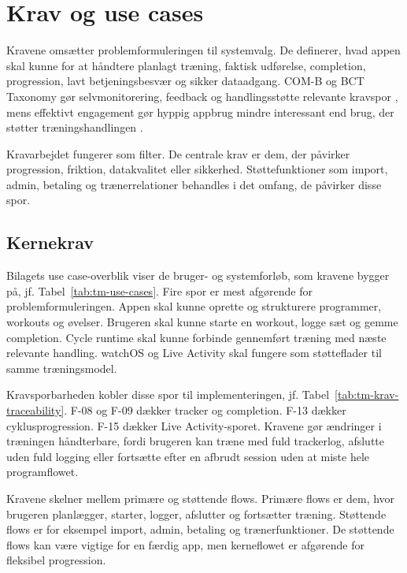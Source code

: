 \section{Krav og use cases}

Kravene omsætter problemformuleringen til systemvalg. De definerer, hvad appen skal kunne for at håndtere planlagt træning, faktisk udførelse, completion, progression, lavt betjeningsbesvær og sikker dataadgang. COM-B og BCT Taxonomy gør selvmonitorering, feedback og handlingsstøtte relevante kravspor \cite{michie2011_behaviour_change_wheel,michie2013_bct_taxonomy_v1}, mens effektivt engagement gør hyppig appbrug mindre interessant end brug, der støtter træningshandlingen \cite{yardley2016_effective_engagement_dbci}.

Kravarbejdet fungerer som filter. De centrale krav er dem, der påvirker progression, friktion, datakvalitet eller sikkerhed. Støttefunktioner som import, admin, betaling og trænerrelationer behandles i det omfang, de påvirker disse spor.

\subsection{Kernekrav}

Bilagets use case-overblik viser de bruger- og systemforløb, som kravene bygger på, jf. Tabel~\ref{tab:tm-use-cases}. Fire spor er mest afgørende for problemformuleringen. Appen skal kunne oprette og strukturere programmer, workouts og øvelser. Brugeren skal kunne starte en workout, logge sæt og gemme completion. Cycle runtime skal kunne forbinde gennemført træning med næste relevante handling. watchOS og Live Activity skal fungere som støtteflader til samme træningsmodel.

Kravsporbarheden kobler disse spor til implementeringen, jf. Tabel~\ref{tab:tm-krav-traceability}. F-08 og F-09 dækker tracker og completion. F-13 dækker cyklusprogression. F-15 dækker Live Activity-sporet. Kravene gør ændringer i træningen håndterbare, fordi brugeren kan træne med fuld trackerlog, afslutte uden fuld logging eller fortsætte efter en afbrudt session uden at miste hele programflowet.

Kravene skelner mellem primære og støttende flows. Primære flows er dem, hvor brugeren planlægger, starter, logger, afslutter og fortsætter træning. Støttende flows er for eksempel import, admin, betaling og trænerfunktioner. De støttende flows kan være vigtige for en færdig app, men kerneflowet er afgørende for fleksibel progression.

